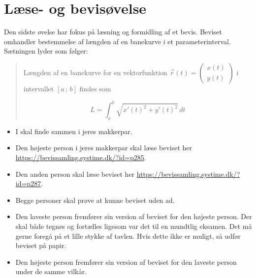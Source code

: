 \documentclass[a4paper, 12pt]{article}
\begin{document}
\newpage
\section*{Læse- og bevisøvelse}
\label{sec:org264ef8e}

Den sidste øvelse har fokus på læsning og formidling af et bevis. Beviset omhandler bestemmelse af længden af en banekurve i et parameterinterval. Sætningen lyder som følger:

\begin{quote}
Længden af en banekurve for en vektorfunktion \(\vec{r}(t) = \begin{pmatrix} x(t) \\ y(t) \end{pmatrix}\) i intervallet \([a\,;\,b]\) findes som 

$$ L = \int_a^b \sqrt{ x'(t)^2 + y'(t)^2} \, dt$$
\end{quote}

\begin{itemize}
\item I skal finde sammen i jeres makkerpar.

\item Den højeste person i jeres makkerpar skal læse beviset her \url{https://bevissamling.systime.dk/?id=p285}.

\item Den anden person skal læse beviset her \url{https://bevissamling.systime.dk/?id=p287}.

\item Begge personer skal prøve at kunne beviset uden ad.

\item Den laveste person fremfører sin version af beviset for den højeste person. Der skal både tegnes og fortælles ligesom var det til en mundtlig eksamen. Det må gerne foregå på et lille stykke af tavlen. Hvis dette ikke er muligt, så udfør beviset på papir.

\item Den højeste person fremfører sin version af beviset for den laveste person under de samme vilkår.
\end{itemize}
\end{document}
